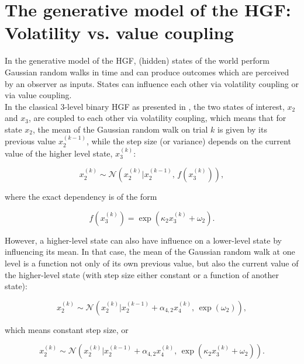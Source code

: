 \section{The generative model of the HGF: Volatility vs. value coupling}

In the generative model of the HGF, (hidden) states of the world perform Gaussian random walks in time and can produce outcomes which are perceived by an observer as inputs. States can influence each other via volatility coupling or via value coupling.\\

In the classical 3-level binary HGF as presented in \cite{Mathys2011}, the two states of interest, $x_2$ and $x_3$, are coupled to each other via volatility coupling, which means that for state $x_2$, the mean of the Gaussian random walk on trial $k$ is given by its previous value $x_2^{(k-1)}$, while the step size (or variance) depends on the current value of the higher level state, $x_3^{(k)}$:

\begin{equation}
    x_2^{(k)} \sim \mathcal{N}(x_2^{(k)} | x_2^{(k-1)}, \, f(x_3^{(k)})), 
\end{equation} 

where the exact dependency is of the form

\begin{equation}
    f(x_3^{(k)}) = \exp(\kappa_2 x_3^{(k)} + \omega_2).
\end{equation}

However, a higher-level state can also have influence on a lower-level state by influencing its mean. In that case, the mean of the Gaussian random walk at one level is a function not only of its own previous value, but also the current value of the higher-level state (with step size either constant or a function of another state):

\begin{equation}
    x_2^{(k)} \sim \mathcal{N}(x_2^{(k)} | x_2^{(k-1)} + \alpha_{4,2} x_4^{(k)}, \, \exp(\omega_2)),
\end{equation}

which means constant step size, or

\begin{equation}
    x_2^{(k)} \sim \mathcal{N}(x_2^{(k)} | x_2^{(k-1)} + \alpha_{4,2} x_4^{(k)}, \, \exp(\kappa_2 x_3^{(k)} + \omega_2)).
\end{equation}

